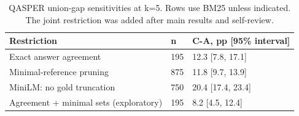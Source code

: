 \begin{table}[htbp]\centering\small\caption{QASPER union-gap sensitivities at k=5. Rows use BM25 unless indicated. The joint restriction was added after main results and self-review.}
\begin{tabular}{p{238pt}p{30pt}p{128pt}}
\toprule
Restriction & n & C-A, pp [95\% interval] \\
\midrule
Exact answer agreement & 195 & 12.3 [7.8, 17.1] \\
Minimal-reference pruning & 875 & 11.8 [9.7, 13.9] \\
MiniLM: no gold truncation & 750 & 20.4 [17.4, 23.4] \\
Agreement + minimal sets (exploratory) & 195 & 8.2 [4.5, 12.4] \\
\bottomrule\end{tabular}\end{table}
